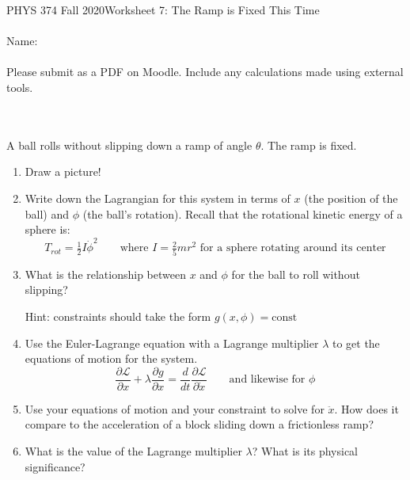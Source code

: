 \documentclass[12pt]{article}
\begin{document}
PHYS 374 Fall 2020\hfill Worksheet 7: The Ramp is Fixed This Time\\
\\
Name:\\
\\
Please submit as a PDF on Moodle. Include any calculations made using external tools.

\hrulefill
\\
\\
A ball rolls without slipping down a ramp of angle $\theta$. The ramp is fixed. 

\begin{enumerate}
\item Draw a picture!
\item Write down the Lagrangian for this system in terms of $x$ (the position of the ball) and $\phi$ (the ball's rotation). Recall that the rotational kinetic energy of a sphere is:
$$
T_{rot} = \tfrac{1}{2} I \dot{\phi}^2
\quad\quad\text{where $I=\tfrac{2}{5}mr^2$ for a sphere rotating around its center}
$$
\item What is the relationship between $x$ and $\phi$ for the ball to roll without slipping?

Hint: constraints should take the form $g(x, \phi) = \text{const}$
\item Use the Euler-Lagrange equation with a Lagrange multiplier $\lambda$ to get the equations of motion for the system.
$$
\frac{\partial \mathcal{L}}{\partial x} + \lambda \frac{\partial g}{\partial x} = \frac{d}{dt} \frac{\partial \mathcal{L}}{\partial \dot{x}}
\quad\quad\text{and likewise for $\phi$}
$$
\item Use your equations of motion and your constraint to solve for $\ddot{x}$. How does it compare to the acceleration of a block sliding down a frictionless ramp? 
\item What is the value of the Lagrange multiplier $\lambda$? What is its physical significance?

\end{enumerate}

\newpage
\end{document}
